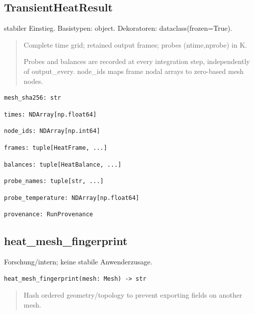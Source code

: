 \subsection{TransientHeatResult}
stabiler Einstieg.
Basistypen: object. Dekoratoren: dataclass(frozen=True).
\begin{quote}
Complete time grid; retained output frames; probes (ntime,nprobe) in K.\par Probes and balances are recorded at every integration step, independently of output\_every. node\_ids maps frame nodal arrays to zero-based mesh nodes.
\end{quote}
\begin{lstlisting}
mesh_sha256: str
\end{lstlisting}
\begin{lstlisting}
times: NDArray[np.float64]
\end{lstlisting}
\begin{lstlisting}
node_ids: NDArray[np.int64]
\end{lstlisting}
\begin{lstlisting}
frames: tuple[HeatFrame, ...]
\end{lstlisting}
\begin{lstlisting}
balances: tuple[HeatBalance, ...]
\end{lstlisting}
\begin{lstlisting}
probe_names: tuple[str, ...]
\end{lstlisting}
\begin{lstlisting}
probe_temperature: NDArray[np.float64]
\end{lstlisting}
\begin{lstlisting}
provenance: RunProvenance
\end{lstlisting}
\subsection{heat\_mesh\_fingerprint}
Forschung/intern; keine stabile Anwenderzusage.
\begin{lstlisting}
heat_mesh_fingerprint(mesh: Mesh) -> str
\end{lstlisting}
\begin{quote}
Hash ordered geometry/topology to prevent exporting fields on another mesh.
\end{quote}
